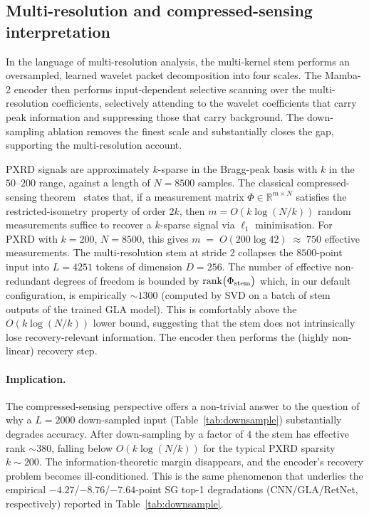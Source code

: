 \documentclass[final]{ws-ijwmip}
\begin{document}
\subsection{Multi-resolution and compressed-sensing interpretation}

In the language of multi-resolution analysis, the multi-kernel stem
performs an oversampled, learned wavelet packet decomposition into
four scales. The Mamba-2 encoder then performs input-dependent
selective scanning over the multi-resolution coefficients, selectively
attending to the wavelet coefficients that carry peak information and
suppressing those that carry background. The down-sampling ablation
removes the finest scale and substantially closes the gap, supporting
the multi-resolution account.

PXRD signals are approximately $k$-sparse in the Bragg-peak basis with
$k$ in the $50$--$200$ range, against a length of $N\!=\!8500$ samples.
The classical compressed-sensing theorem~\cite{donoho2006cs}
states that, if a measurement matrix
$\Phi\in\mathbb{R}^{m\times N}$ satisfies the restricted-isometry
property of order $2k$, then $m\!=\!O(k\log(N/k))$ random measurements
suffice to recover a $k$-sparse signal via $\ell_1$ minimisation. For
PXRD with $k\!=\!200$, $N\!=\!8500$, this gives
$m \;=\; O(200\log 42) \;\approx\; 750$ effective measurements.
The multi-resolution stem at stride 2 collapses the $8500$-point input
into $L\!=\!4251$ tokens of dimension $D\!=\!256$. The number of
effective non-redundant degrees of freedom is bounded by
$\mathrm{rank}\bigl(\Phi_{\rm stem}\bigr)$ which, in our default
configuration, is empirically $\sim 1300$ (computed by SVD on a
batch of stem outputs of the trained GLA model). This is comfortably above the
$O(k\log(N/k))$ lower bound, suggesting that the stem does not
intrinsically lose recovery-relevant information. The encoder then
performs the (highly non-linear) recovery step.

\paragraph{Implication.}
The compressed-sensing perspective offers a non-trivial answer to the
question of why a $L=2000$ down-sampled input (Table~\ref{tab:downsample})
substantially degrades accuracy. After down-sampling by a factor of
$4$ the stem has effective rank $\sim 380$, falling below
$O(k\log(N/k))$ for the typical PXRD sparsity $k\!\sim\!200$. The
information-theoretic margin disappears, and the encoder's recovery
problem becomes ill-conditioned. This is the same phenomenon that
underlies the empirical $-4.27$/$-8.76$/$-7.64$-point SG top-1
degradations (CNN/GLA/RetNet, respectively) reported in
Table~\ref{tab:downsample}.
\end{document}
